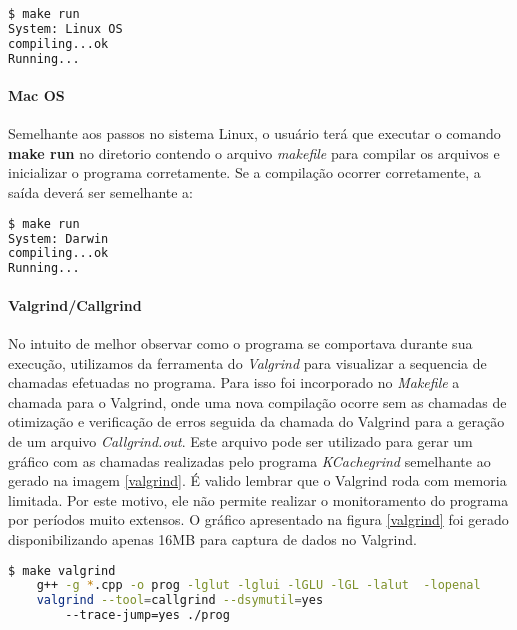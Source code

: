 \begin{lstlisting}[language=bash,title=\textit{Saída do terminal - Linux},numbers=none]
$ make run
System: Linux OS
compiling...ok
Running...
\end{lstlisting}

\paragraph{\textbf{Mac OS}}

Semelhante aos passos no sistema Linux, o usuário terá que executar o comando \textbf{make run} no diretorio contendo o arquivo \textit{makefile} para compilar os arquivos e inicializar o programa corretamente. Se a compilação ocorrer corretamente, a saída deverá ser semelhante a:

\begin{lstlisting}[language=bash,title=\textit{Saída do terminal - Mac OS},numbers=none]
$ make run
System: Darwin
compiling...ok
Running...
\end{lstlisting}


\paragraph{\textbf{Valgrind/Callgrind}}

No intuito de melhor observar como o programa se comportava durante sua execução, utilizamos da ferramenta do \textit{Valgrind} para visualizar a sequencia de chamadas efetuadas no programa.
Para isso foi incorporado no \textit{Makefile} a chamada para o Valgrind, onde uma nova compilação ocorre sem as chamadas de otimização e verificação de erros seguida da chamada do Valgrind para a geração de um arquivo \textit{Callgrind.out}. Este arquivo pode ser utilizado para gerar um gráfico com as chamadas realizadas pelo programa \textit{KCachegrind} semelhante ao gerado na imagem \ref{valgrind}. É valido lembrar que o Valgrind roda com memoria limitada. Por este motivo, ele não permite realizar o monitoramento do programa por períodos muito extensos. O gráfico apresentado na figura \ref{valgrind} foi gerado disponibilizando apenas 16MB para captura de dados no Valgrind.

\begin{lstlisting}[language=bash,title=\textit{Gerando arquivo callgrind.out},numbers=none]
$ make valgrind
	g++ -g *.cpp -o prog -lglut -lglui -lGLU -lGL -lalut  -lopenal
	valgrind --tool=callgrind --dsymutil=yes 
		--trace-jump=yes ./prog
\end{lstlisting}

